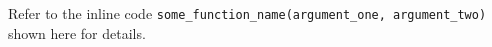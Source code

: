 Refer to the inline code
\lstinline|some_function_name(argument_one, argument_two)|
shown here for details.
